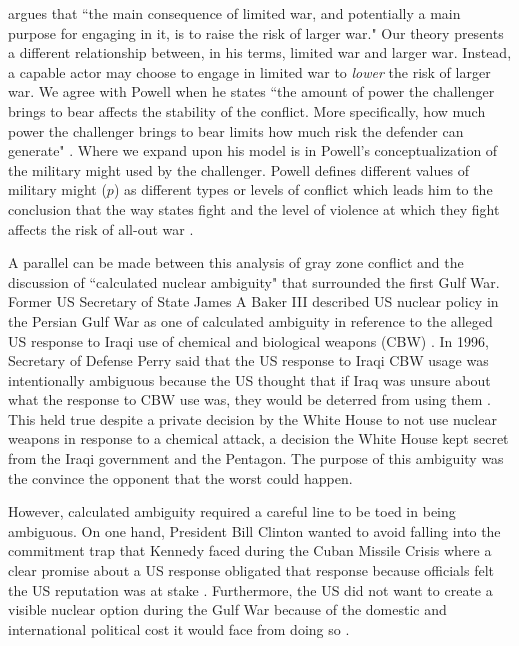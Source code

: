\documentclass[12pt,letterpaper]{article}
\begin{document}
		\citet{schelling_armsinfluence_1966} argues that ``the main consequence of limited war, and potentially a main purpose for engaging in it, is to raise the risk of larger war." Our theory presents a different relationship between, in his terms, limited war and larger war. Instead, a capable actor may choose to engage in limited war to \textit{lower} the risk of larger war. We agree with Powell when he states ``the amount of power the challenger brings to bear affects the stability of the conflict. More specifically, how much power the challenger brings to bear limits how much risk the defender can generate" \citep{powell_nuclearbrinkmanshiplimited_2015}. Where we expand upon his model is in Powell's conceptualization of the military might used by the challenger. Powell defines different values of military might ($p$) as different types or levels of conflict which leads him to the conclusion that the way states fight and the level of violence at which they fight affects the risk of all-out war \citep{powell_nuclearbrinkmanshiplimited_2015}.
				
		A parallel can be made between this analysis of gray zone conflict and the discussion of ``calculated nuclear ambiguity" that surrounded the first Gulf War. Former US Secretary of State James A Baker III described US nuclear policy in the Persian Gulf War as one of calculated ambiguity in reference to the alleged US response to Iraqi use of chemical and biological weapons (CBW) \citep{arkin_calculatedambiguitynuclear_1996}. In 1996, Secretary of Defense Perry said that the US response to Iraqi CBW usage was intentionally ambiguous because the US thought that if Iraq was unsure about what the response to CBW use was, they would be deterred from using them \citep{sagan_casenofirst_2009}. This held true despite a private decision by the White House to not use nuclear weapons in response to a chemical attack, a decision the White House kept secret from the Iraqi government and the Pentagon. The purpose of this ambiguity was the convince the opponent that the worst could happen.
				
		However, calculated ambiguity required a careful line to be toed in being ambiguous. On one hand, President Bill Clinton wanted to avoid falling into the commitment trap that Kennedy faced during the Cuban Missile Crisis where a clear promise about a US response obligated that response because officials felt the US reputation was at stake \citep{sagan_commitmenttrapwhy_2000}. Furthermore, the US did not want to create a visible nuclear option during the Gulf War because of the domestic and international political cost it would face from doing so \citep{arkin_calculatedambiguitynuclear_1996}.
				
\end{document}
